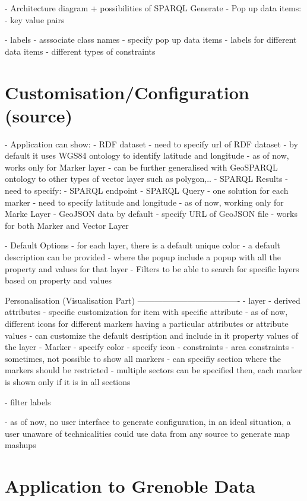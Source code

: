 \documentclass[a4paper,pagenum,english]{rnti}
\begin{document}
- Architecture diagram + possibilities of SPARQL Generate
- Pop up data items:
	- key value pairs

- labels 
- asssociate class names
- specify pop up data items
	- labels for different data items
- different types of constraints
\section{Customisation/Configuration (source) }
- Application can show:
	- RDF dataset
		- need to specify url of RDF dataset
		- by default it uses WGS84 ontology to identify latitude and longitude
		- as of now, works only for Marker layer
		- can be further generalised with GeoSPARQL ontology to other types of vector layer such as polygon,.. 
	- SPARQL Results
		- need to specify:
			- SPARQL endpoint
			- SPARQL Query
			- one solution for each marker
			- need to specify latitude and longitude
			- as of now, working only for Marke Layer
	- GeoJSON data by default
		- specify URL of GeoJSON file
		- works for both Marker and Vector Layer

- Default Options
	- for each layer, there is a default unique color
	- a default description can be provided
		- where the popup include a popup with all the property and values for that layer
	- Filters to be able to search for specific layers based on property and values

Personalisation (Visualisation Part)
-------------------------------------
	- layer
		- derived attributes
		- specific customization for item with specific attribute
			- as of now, different icons for different markers having a particular attributes or attribute values
		- can customize the default desription and include in it property values of the layer
	- Marker
		- specify color
		- specify icon
	- constraints
		- area constraints
			- sometimes, not possible to show all markers
			- can specifiy section where the markers should be restricted
			- multiple sectors can be specified then, each marker is shown only if it is in all sections

	- filter labels

- as of now, no user interface to generate configuration, in an ideal situation, a user unaware of technicalities could use data from any source to generate map mashups

\section{Application to Grenoble Data}
\end{document}

